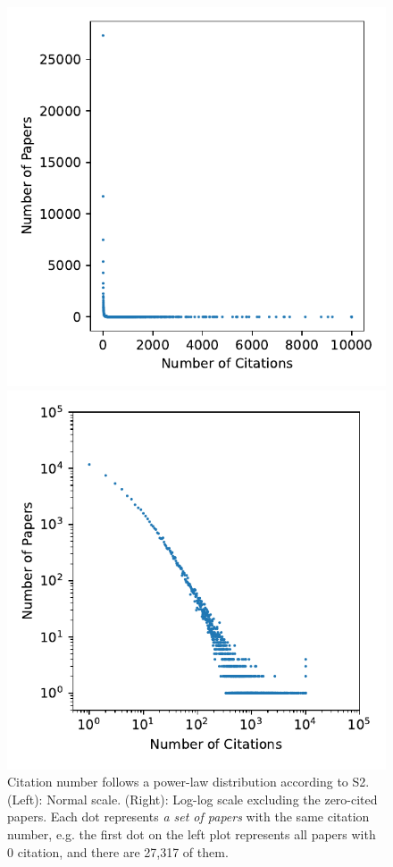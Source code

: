 \begin{figure}
    \centering
    \begin{minipage}{0.48\textwidth}
        \includegraphics[width=\textwidth]{images/s2_dist.pdf}
    \end{minipage}%
    \begin{minipage}{0.48\textwidth}
        \includegraphics[width=\textwidth]{images/s2_dist_log.pdf}
    \end{minipage}
    \caption{Citation number follows a power-law distribution according to S2.
    (Left): Normal scale. (Right): Log-log scale excluding the zero-cited papers.
    Each dot represents \emph{a set of papers} with the same citation number, e.g. the first dot on the left plot represents all papers with 0 citation, and there are 27,317 of them.
    }
    \label{fig:s2_dist}
\end{figure}

